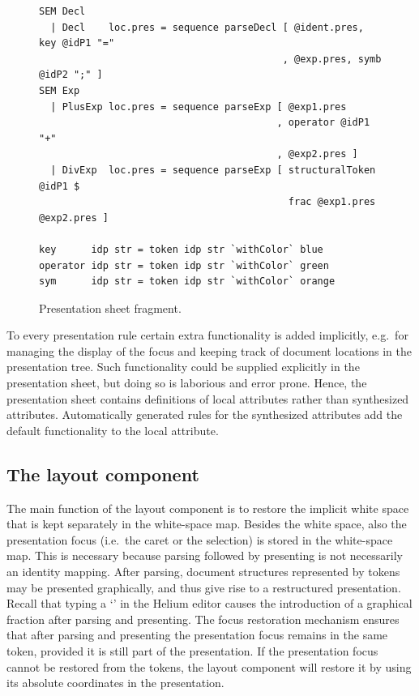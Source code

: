 \documentclass{article}[10pt]
\begin{document}
\begin{figure}
\begin{center}
\begin{footnotesize}
\begin{verbatim}
SEM Decl
  | Decl    loc.pres = sequence parseDecl [ @ident.pres, key @idP1 "="
                                          , @exp.pres, symb @idP2 ";" ]
SEM Exp
  | PlusExp loc.pres = sequence parseExp [ @exp1.pres
                                         , operator @idP1 "+"
                                         , @exp2.pres ]
  | DivExp  loc.pres = sequence parseExp [ structuralToken @idP1 $ 
                                           frac @exp1.pres @exp2.pres ]
                  
key      idp str = token idp str `withColor` blue
operator idp str = token idp str `withColor` green
sym      idp str = token idp str `withColor` orange
\end{verbatim}%
\end{footnotesize}
\caption{Presentation sheet fragment.} \label{fig:presentationSheet} 
\end{center}
\end{figure}

\bc  
To every presentation rule certain extra functionality is added implicitly, e.g.\ for managing the display of the focus and keeping track of document locations in the presentation tree. Such functionality could be supplied explicitly in the presentation sheet, but doing so is laborious and error prone. Hence, the presentation sheet contains definitions of local attributes  rather than synthesized attributes. Automatically generated rules for the synthesized  attributes add the default functionality to the local attribute.
\ec

\subsection{The layout component}

The main function of the layout component is to restore the implicit white space that is kept separately in the white-space map. Besides the white space, also the presentation focus (i.e.\ the caret or the selection) is stored in the white-space map. This is necessary because parsing followed by presenting is not necessarily an identity mapping. After parsing, document structures represented by tokens may be presented graphically, and thus give rise to a restructured presentation. Recall that typing a `\p{/}' in the Helium editor causes the introduction of a graphical fraction after parsing and presenting. The focus restoration mechanism ensures that after parsing and presenting the presentation focus remains in the same token, provided it is still part of the presentation. If the presentation focus cannot be restored from the tokens, the layout component will restore it by using its absolute coordinates in the presentation.
\end{document}
